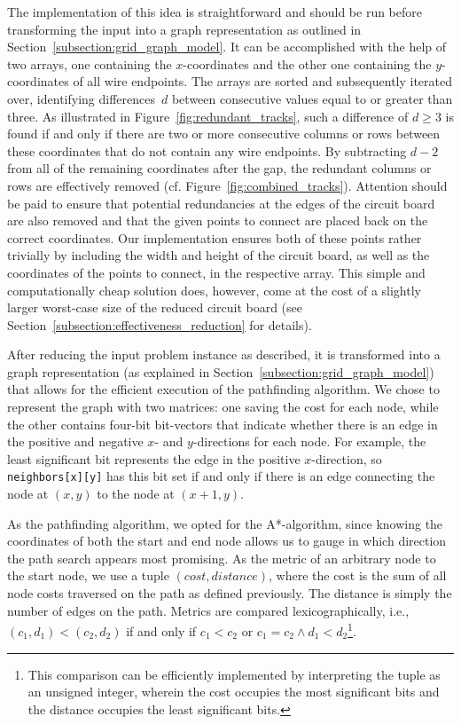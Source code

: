 \documentclass[sigconf,nonacm,screen]{acmart}
\begin{document}
The implementation of this idea is straightforward and should be run before transforming the input into a graph representation as outlined in Section~\ref{subsection:grid_graph_model}.
It can be accomplished with the help of two arrays, one containing the $x$-coordinates and the other one containing the $y$-coordinates of all wire endpoints. The arrays are sorted and subsequently iterated over, identifying differences~$d$ between consecutive values equal to or greater than three. As illustrated in Figure~\ref{fig:redundant_tracks}, such a difference of $d\geq3$ is found if and only if there are two or more consecutive columns or rows between these coordinates that do not contain any wire endpoints. By subtracting $d-2$ from all of the remaining coordinates after the gap, the redundant columns or rows are effectively removed (cf. Figure~\ref{fig:combined_tracks}). Attention should be paid to ensure that potential redundancies at the edges of the circuit board are also removed and that the given points to connect are placed back on the correct coordinates. Our implementation ensures both of these points rather trivially by including the width and height of the circuit board, as well as the coordinates of the points to connect, in the respective array. \label{subsection:incl_points_to_connect_in_arrays} This simple and computationally cheap solution does, however, come at the cost of a slightly larger worst-case size of the reduced circuit board (see Section~\ref{subsection:effectiveness_reduction} for details).

After reducing the input problem instance as described, it is transformed into a graph representation (as explained in Section~\ref{subsection:grid_graph_model}) that allows for the efficient execution of the pathfinding algorithm. We chose to represent the graph with two matrices: one saving the cost for each node, while the other contains four-bit bit-vectors that indicate whether there is an edge in the positive and negative $x$- and $y$-directions for each node. For example, the least significant bit represents the edge in the positive $x$-direction, so \verb|neighbors[x][y]| has this bit set if and only if there is an edge connecting the node at $(x,y)$ to the node at $(x+1,y)$.

As the pathfinding algorithm, we opted for the A*-algorithm, since knowing the coordinates of both the start and end node allows us to gauge in which direction the path search appears most promising. As the metric of an arbitrary node to the start node, we use a tuple $(cost, distance)$, where the cost is the sum of all node costs traversed on the path as defined previously. The distance is simply the number of edges on the path. Metrics are compared lexicographically, i.e., $(c_1,d_1) < (c_2,d_2)$ if and only if $c_1 < c_2$ or $c_1 = c_2 \wedge d_1 < d_2$\footnote{This comparison can be efficiently implemented by interpreting the tuple as an unsigned integer, wherein the cost occupies the most significant bits and the distance occupies the least significant bits.}.
\end{document}
